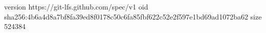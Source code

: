 version https://git-lfs.github.com/spec/v1
oid sha256:4b6a4d8a7bf8fa39ed8f0178c50c6fa85fbf622c52e2f597e1bd69ad1072ba62
size 524384
